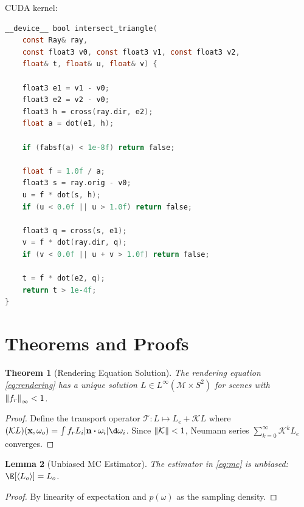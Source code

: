 \documentclass[12pt,a4paper]{article}
\newtheorem{theorem}{Theorem}[section]
\newtheorem{lemma}[theorem]{Lemma}
\begin{document}
CUDA kernel:
\begin{lstlisting}[language=C, caption=CUDA ray-triangle intersection, label=lst:cuda]
__device__ bool intersect_triangle(
    const Ray& ray,
    const float3 v0, const float3 v1, const float3 v2,
    float& t, float& u, float& v) {

    float3 e1 = v1 - v0;
    float3 e2 = v2 - v0;
    float3 h = cross(ray.dir, e2);
    float a = dot(e1, h);

    if (fabsf(a) < 1e-8f) return false;

    float f = 1.0f / a;
    float3 s = ray.orig - v0;
    u = f * dot(s, h);
    if (u < 0.0f || u > 1.0f) return false;

    float3 q = cross(s, e1);
    v = f * dot(ray.dir, q);
    if (v < 0.0f || u + v > 1.0f) return false;

    t = f * dot(e2, q);
    return t > 1e-4f;
}
\end{lstlisting}

\section{Theorems and Proofs}\label{sec:theorems}
\begin{theorem}[Rendering Equation Solution]
The rendering equation \cref{eq:rendering} has a unique solution
$L \in L^\infty(\mathcal{M} \times S^2)$ for scenes with
$\norm{f_r}_\infty < 1$.
\end{theorem}

\begin{proof}
Define the transport operator $\mathcal{T}: L \mapsto L_e + \mathcal{K}L$
where $(\mathcal{K}L)(\vb{x}, \omega_o) = \int f_r L_i \abs{\vb{n} \vdot \omega_i} \d\omega_i$.
Since $\norm{\mathcal{K}} < 1$, Neumann series $\sum_{k=0}^\infty \mathcal{K}^k L_e$ converges.
\end{proof}

\begin{lemma}[Unbiased MC Estimator]
The estimator in \cref{eq:mc} is unbiased: $\E[\langle L_o \rangle] = L_o$.
\end{lemma}

\begin{proof}
By linearity of expectation and $p(\omega)$ as the sampling density.
\end{proof}
\end{document}
